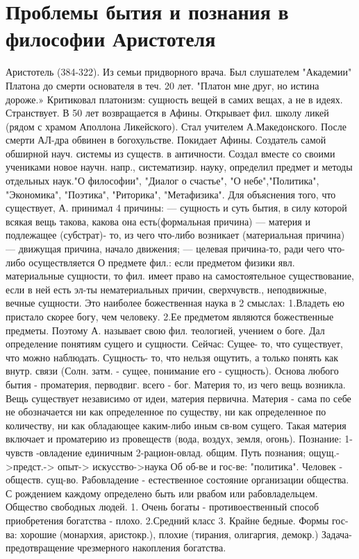 \documentclass[12pt]{article}
\begin{document}
\newpage
\section{Проблемы бытия и познания в философии Аристотеля}
Аристотель (384-322). Из семьи придворного врача. Был слушателем "Академии" Платона до смерти основателя
в теч. 20 лет. "Платон мне друг, но истина дороже.» Критиковал платонизм: сущность вещей в самих вещах, а не
в идеях. Странствует. В 50 лет возвращается в Афины. Открывает фил. школу ликей (рядом с храмом Аполлона
Ликейского). Стал учителем А.Македонского. После смерти АЛ-дра обвинен в богохульстве. Покидает Афины.
Создатель самой обширной науч. системы из существ. в античности. Создал вместе со своими учениками новое
научн. напр., систематизир. науку, определил предмет и методы отдельных наук."О философии", "Диалог о
счастье", "О небе","Политика", "Экономика", "Поэтика", "Риторика", "Метафизика". 
Для объяснения того, что существует, А. принимал 4 причины:
— сущность и суть бытия, в силу которой всякая вещь такова, какова она есть(формальная причина)
— материя и подлежащее (субстрат)- то, из чего что-либо возникает (материальная причина)
— движущая причина, начало движения;
— целевая причина-то, ради чего что-либо осуществляется
О предмете фил.: если предметом физики явл. материальные сущности, то фил. имеет право на самостоятельное
существование, если в ней есть эл-ты нематериальных причин, сверхчувств., неподвижные, вечные сущности. 
Это наиболее божественная наука в 2 смыслах: 
1.Владеть ею пристало скорее богу, чем человеку. 
2.Ее предметом являются божественные предметы. 
Поэтому А. называет свою фил. теологией, учением о боге. Дал определение понятиям сущего и сущности.
Сейчас: Сущее- то, что существует, что можно наблюдать. Сущность- то, что нельзя ощутить, а только понять
как  внутр.  связи  (Солн.  затм.  -  сущее,  понимание  его  -  сущность).  Основа  любого  бытия  -  проматерия,
перводвиг. всего - бог. Материя то, из чего вещь возникла. Вещь существует независимо от идеи, материя
первична. Материя - сама по себе не обозначается ни как определенное по существу, ни как определенное по
количеству, ни как обладающее каким-либо иным св-вом сущего. Такая материя включает и проматерию из
провеществ (вода, воздух, земля, огонь).
Познание: 1-чувств -овладение единичным 2-рацион-овлад. общим. 
Путь познания; ощущ.->предст.-> опыт-> искусство->наука
Об об-ве и гос-ве: "политика". Человек - обществ. сущ-во. Рабовладение - естественное состояние организации
общества. С рождением каждому определено быть или рвабом или рабовладельцем.
Общество свободных людей. 
1. Очень богаты - противоественный способ приобретения богатства - плохо. 
2.Средний класс 
3. Крайне бедные. 
Формы гос-ва: хорошие (монархия, аристокр.), плохие (тирания, олигаргия, демокр.) Задача- предотвращение
чрезмерного накопления богатства.
\end{document}
